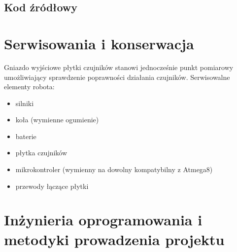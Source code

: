 \documentclass[11pt,a4paper]{article}
\begin{document}
  \subsection{Kod źródłowy}
  
   
\section{Serwisowania i konserwacja} 
  Gniazdo wyjściowe płytki czujników stanowi jednocześnie punkt pomiarowy umożliwiający sprawdzenie poprawności działania czujników.
  Serwisowalne elementy robota:
  \begin{itemize}
    \item silniki 
    \item koła (wymienne ogumienie)
    \item baterie
    \item płytka czujników
    \item mikrokontroler (wymienny na dowolny kompatybilny z Atmega8)
    \item przewody łączące płytki
  \end{itemize}

\section{Inżynieria oprogramowania i metodyki prowadzenia projektu}
\end{document}
